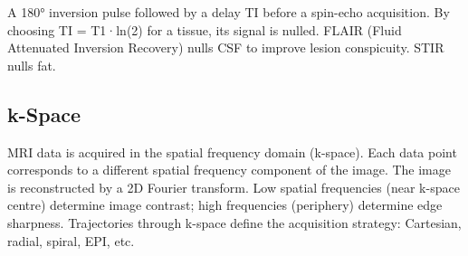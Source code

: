 A 180° inversion pulse followed by a delay TI before a spin-echo acquisition. By choosing TI = T1·ln(2) for a tissue, its signal is nulled. FLAIR (Fluid Attenuated Inversion Recovery) nulls CSF to improve lesion conspicuity. STIR nulls fat.

				

\subsection{k-Space}

				

MRI data is acquired in the spatial frequency domain (k-space). Each data point corresponds to a different spatial frequency component of the image. The image is reconstructed by a 2D Fourier transform. Low spatial frequencies (near k-space centre) determine image contrast; high frequencies (periphery) determine edge sharpness. Trajectories through k-space define the acquisition strategy: Cartesian, radial, spiral, EPI, etc.



